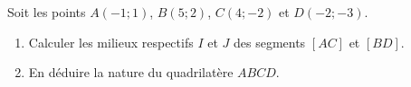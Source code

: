 
Soit les points $A(-1;1)$, $B(5;2)$, $C(4;-2)$ et $D(-2;-3)$. 
\begin{enumerate}
\item Calculer les milieux respectifs $I$ et $J$ des segments $[AC]$ et $[BD]$.
\item En déduire la nature du quadrilatère $ABCD$.
\end{enumerate}